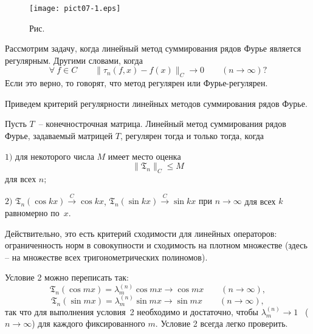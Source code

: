 

\begin{figure}[ht]
\begin{center}
\texttt{[image: pict07-1.eps]}
\end{center}
 \bigskip
 \label{r7-1}

 \centerline{Рис.~\theris}
 \bigskip
\end{figure}




{Рассмотрим задачу, когда линейный метод суммирования рядов Фурье является} {регулярным.}
Другими словами, когда
$$
\forall\ f\in C\qquad \|\tau_n(f,x)-f(x)\|_C\to 0\qquad (n\to
\infty)?
$$
Если это верно, то говорят, что метод регулярен или Фурье-регулярен.

Приведем критерий регулярности линейных методов суммирования рядов Фурье.

\begin{teo}
Пусть $T$~-- конечнострочная матрица. Линейный метод суммирования рядов Фурье,
задаваемый матрицей $T$, регулярен тогда и только тогда, когда

$1)$ для некоторого числа $M$ имеет место оценка
$$
\|{\mathfrak{T}}_n\|_C\le M
$$
для всех $n;$

$2)$ ${\mathfrak{T}}_n(\cos kx)\stackrel{C}{\longrightarrow} \cos kx$,
${\mathfrak{T}}_n (\sin kx)
\stackrel{C}{\longrightarrow} \sin kx$ {при $n\to \infty$} для
всех $k$ равномерно по~$x.$
\end{teo}

Действительно, это есть критерий сходимости для линейных операторов: ограниченность
норм в совокупности и сходимость на плотном множестве
(здесь -- на множестве всех тригонометрических полиномов).

Условие 2 можно переписать так:
$$
{\mathfrak{T}}_n(\cos mx) = \lambda_m^{(n)} \cos mx \to \cos
mx\qquad (n\to \infty),
$$
$$
{\mathfrak{T}}_n(\sin mx) = \lambda_m^{(n)} \sin mx \to \sin mx \qquad (n\to \infty),
$$
так что для выполнения условия~2 необходимо и достаточно, чтобы $\lambda_m^{(n)}\to 1$~
($n\to \infty$) для каждого фиксированного $m$. Условие
2 всегда легко проверить.

